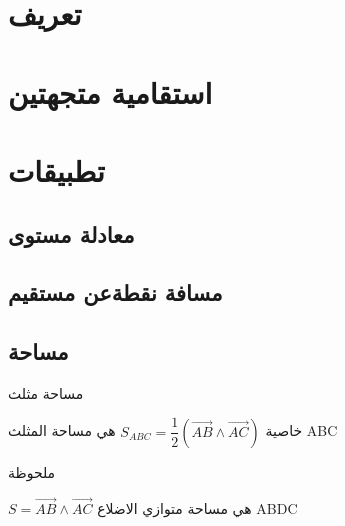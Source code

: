 \documentclass{beamer}
\begin{document}

\section{ تعريف }



\section{ استقامية متجهتين}

\section{تطبيقات}
\subsection{معادلة مستوى}

\subsection{مسافة نقطةعن مستقيم}


\subsection{‫مساحة ‬}
\begin{frame}{مساحة مثلث‬}
	\begin{block}{خاصية}
		$ S_{ABC} = \dfrac{1}{2} (\overrightarrow{AB}\land \overrightarrow{AC})$
		هي مساحة المثلث ABC
	\end{block}
	
	\begin{block}{ملحوظة }
		
		$ S =\overrightarrow{AB}\land \overrightarrow{AC}$
		هي مساحة متوازي الاضلاع   ABDC
	\end{block}
\end{frame}

\end{document}
